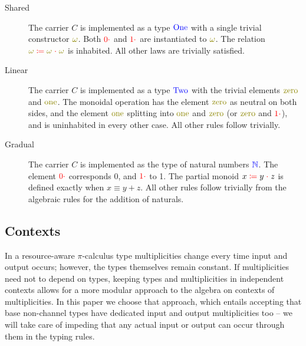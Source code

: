 \documentclass[a4paper,UKenglish,cleveref, autoref, thm-restate,authorcolumns]{lipics-v2019}
\theoremstyle{definition}
\newcommand{\picalc}{$\pi$-calculus}
\newcommand{\type}[1]{\textcolor{blue}{\operatorname{#1}}}
\newcommand{\constr}[1]{\textcolor{olive}{\operatorname{#1}}}
\newcommand{\field}[1]{\textcolor{red}{\operatorname{#1}}}
\newcommand{\op}[3]{#1 \; \field{\coloneqq} \; #2 \; \field{\cdot} \; #3}
\newcommand{\zero}{\field{0\cdot}}
\newcommand{\one}{\field{1\cdot}}
\newcommand{\N}{\type{\mathbb{N}}}
\begin{document}
\begin{description}

\item [Shared]

The carrier $C$ is implemented as a type $\type{One}$ with a single trivial constructor $\constr{\omega}$.
Both $\zero$ and $\one$ are instantiated to $\constr{\omega}$.
The relation $\op{\constr{\omega}}{\constr{\omega}}{\constr{\omega}}$ is inhabited.
All other laws are trivially satisfied.

\item [Linear]

The carrier $C$ is implemented as a type $\type{Two}$ with the trivial elements $\constr{zero}$ and $\constr{one}$.
The monoidal operation has the element $\constr{zero}$ as neutral on both sides, and the element $\constr{one}$ splitting into $\constr{one}$ and $\constr{zero}$ (or $\constr{zero}$ and $\constr{\one}$), and is uninhabited in every other case.
All other rules follow trivially.

\item [Gradual]

The carrier $C$ is implemented as the type of natural numbers $\N$.
The element $\zero$ corresponds 0, and $\one$ to 1.
The partial monoid $\op{x}{y}{z}$ is defined exactly when $x \equiv y + z$.
All other rules follow trivially from the algebraic rules for the addition of naturals.

\end{description}

\subsection{Contexts}

In a resource-aware \picalc{} type multiplicities change every time input and output occurs; however, the types themselves remain constant.
If multiplicities need not to depend on types, keeping types and multiplicities in independent contexts allows for a more modular approach to the algebra on contexts of multiplicities.
In this paper we choose that approach, which entails accepting that base non-channel types have dedicated input and output multiplicities too -- we will take care of impeding that any actual input or output can occur through them in the typing rules.
\end{document}
